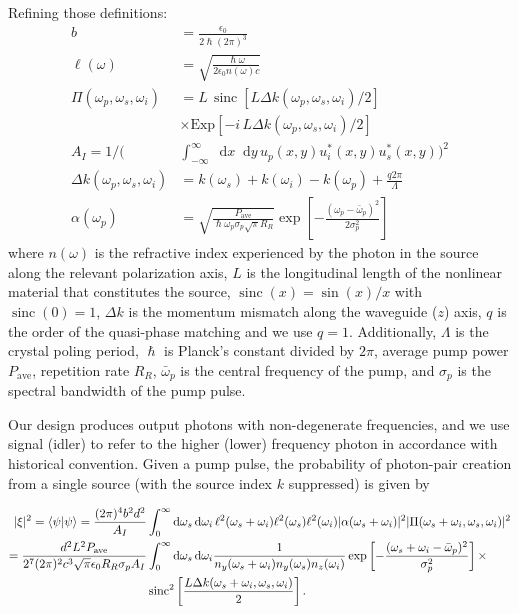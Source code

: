 \documentclass[twocolumn,amssymb, nobibnotes, showpacs, aps, pra,10pt]{revtex4-1}
\newcommand*{\wi}{\omega_{i}}
\newcommand*{\ws}{\omega_{s}}
\newcommand*\diff{\mathop{}\!\mathrm{d}}
\DeclareMathOperator*{\sinc}{\textrm{sinc}}
\begin{document}
Refining those definitions:
\begin{align}
b &=\frac{\epsilon_0}{2 \hslash (2 \pi)^3} \label{eq:b} \\
\ell (\omega) &= \sqrt{\frac{\hslash \omega}{2 \epsilon_0 n (\omega) c}}\\
\Pi(\omega_p, \ws, \wi) &= L \, \sinc \left[ L \Delta k (\omega_p, \ws, \wi) / 2 \right]  \nonumber \\
& \times \text{Exp}[-i\, L \Delta k (\omega_p, \ws, \wi) / 2]  \\
A_I = 1\Big / \Big( &\int_{-\infty}^\infty \diff x \diff y \,u_p (x,y) u_i^* (x,y) u_s^* (x,y) \Big)^{2} \\
\Delta k (\omega_p, \ws, \wi) &= k(\ws) + k(\wi) - k(\omega_p)+ \frac{q 2 \pi}{\Lambda} \\
\alpha (\omega_p) &= \sqrt{\frac{P_{\text{ave}}}{\hslash \omega_p \sigma_p \sqrt{\pi} R_R}} \exp \left[- \frac{(\omega_p - \bar{\omega}_p)^2}{2 \sigma_p^2} \right]
\end{align}
where $n(\omega)$ is the refractive index experienced by the photon in the source along the relevant polarization axis, $L$ is the longitudinal length of the nonlinear material that constitutes the source, $\sinc(x) = \sin(x)/x$ with $\sinc(0)=1$, $\Delta k$ is the momentum mismatch along the waveguide ($z$) axis, $q$ is the order of the quasi-phase matching and we use $q=1$. Additionally, $\Lambda$ is the crystal poling period, $\hslash$ is Planck's constant divided by $2\pi$, average pump power $P_{\text{ave}}$, repetition rate $R_R$, $\bar{\omega}_p$ is the central frequency of the pump, and $\sigma_p$ is the spectral bandwidth of the pump pulse.

Our design produces output photons with non-degenerate frequencies, and we use signal (idler) to refer to the higher (lower) frequency photon in accordance with historical convention. Given a pump pulse, the probability of photon-pair creation from a single source (with the source index $k$ suppressed) is given by
\begin{widetext}
\begin{align}\label{eq:sourceProbExact}
|\xi|^2 = \braket{\psi | \psi} = \frac{(2 \pi)^4 b^2 d^2}{A_I} &\int_0^\infty  \diff \ws \diff \wi \,\ell^2 (\ws + \wi) \ell^2 (\ws ) \ell^2 (\wi) |\alpha (\ws + \wi)|^2 |\Pi (\ws + \wi,\ws, \wi)|^2 \\
= \frac{ d^2 L^2 P_{\text{ave}}}{2^7 (2 \pi)^2 c^3 \sqrt{\pi} \epsilon_0 R_R \sigma_p A_I} &\int_0^\infty  \diff \ws \diff \wi  \frac{1}{n_y(\ws+\wi) n_y(\ws) n_z(\wi)}\exp \left[ - \frac{(\ws + \wi - \bar{\omega}_p)^2}{\sigma_p^2} \right] \times \nonumber \\ 
& \, {\sinc}^2 \left[ \frac{L \Delta k (\ws + \wi, \ws, \wi)}{2} \right].
\end{align}
\end{widetext}
\end{document}
